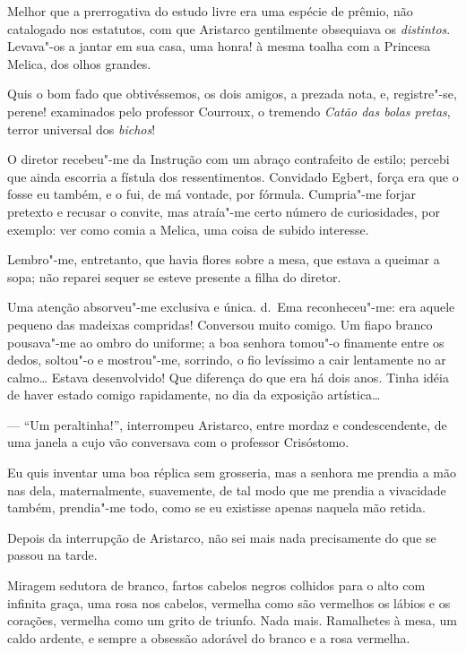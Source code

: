 Melhor que a prerrogativa do estudo livre
era uma espécie de prêmio, não catalogado nos estatutos, com que
Aristarco gentilmente obsequiava os \textit{distintos}. Levava"-os a jantar em
sua casa, uma honra! à mesma toalha com a Princesa Melica, dos olhos grandes. 

Quis o bom fado que obtivéssemos, os dois amigos, a prezada
nota, e, registre"-se, perene! examinados pelo professor Courroux, o
tremendo \textit{Catão das bolas pretas}, terror universal dos \textit{bichos}!

O diretor recebeu"-me da Instrução com um abraço contrafeito de estilo; percebi
que ainda escorria a fístula dos ressentimentos. Convidado Egbert,
força era que o fosse eu também, e o fui, de má vontade, por fórmula.
Cumpria"-me forjar pretexto e recusar o convite, mas atraía"-me certo
número de curiosidades, por exemplo: ver como comia a Melica, uma coisa
de subido interesse. 

Lembro"-me, entretanto, que havia flores sobre a
mesa, que estava a queimar a sopa; não reparei sequer se esteve presente 
a filha do diretor. 

Uma atenção absorveu"-me
exclusiva e única. d.~Ema reconheceu"-me: era aquele pequeno das
madeixas compridas! Conversou muito comigo. Um fiapo branco
pousava"-me ao ombro do uniforme; a boa senhora tomou"-o finamente
entre os dedos, soltou"-o e mostrou"-me, sorrindo, o fio levíssimo a
cair lentamente no ar calmo\ldots{} Estava desenvolvido! Que diferença do
que era há dois anos. Tinha idéia de haver estado comigo rapidamente,
no dia da exposição artística\ldots{} 

--- ``Um peraltinha!'', interrompeu Aristarco, entre mordaz e condescendente, 
de uma janela a cujo vão
conversava com o professor Crisóstomo. 

Eu quis inventar uma boa réplica
sem grosseria, mas a senhora me prendia a mão nas dela, maternalmente,
suavemente, de tal modo que me prendia a vivacidade também,
prendia"-me todo, como se eu existisse apenas naquela mão retida.

Depois da interrupção de Aristarco, não sei mais nada precisamente do
que se passou na tarde. 

Miragem sedutora de branco, fartos cabelos
negros colhidos para o alto com infinita graça, uma rosa nos cabelos,
vermelha como são vermelhos os lábios e os corações, vermelha como um
grito de triunfo. Nada mais. Ramalhetes à mesa, um caldo ardente, e
sempre a obsessão adorável do branco e a rosa vermelha. 

